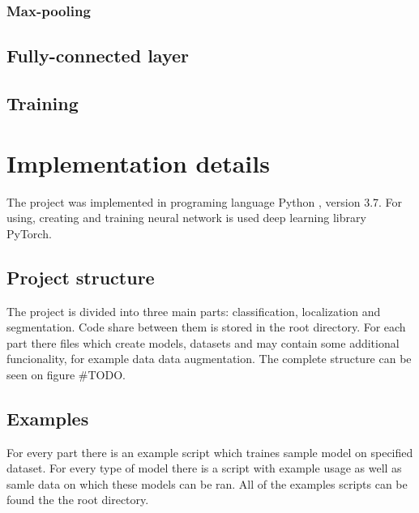 \documentclass[twoside]{ctuthesis}
\theoremstyle{plain}
\theoremstyle{definition}
\theoremstyle{note}
\begin{document}
\subsection{Max-pooling}


\section{Fully-connected layer}


\section{Training}



\chapter{Implementation details}
The project was implemented in programing language Python \cite{Python}, version 3.7.
For using, creating and training neural network is used deep learning library PyTorch\cite{PyTorch}.



\section{Project structure}
The project is divided into three main parts: classification, localization and segmentation.
Code share between them is stored in the root directory. For each part there files which create
models, datasets and may contain some additional funcionality, for example data data augmentation.
The complete structure can be seen on figure #TODO.

\section{Examples}
For every part there is an example script which traines sample model on specified dataset. For
every type of model there is a script with example usage as well as samle data on which these 
models can be ran. All of the examples scripts can be found the the root directory.

\printindex

\appendix




\end{document}
